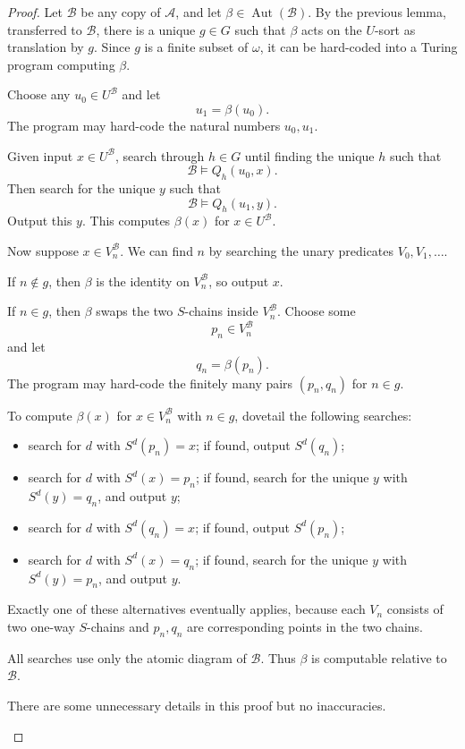 \documentclass[12pt]{article}
\newcommand{\Aut}{\operatorname{Aut}}
\newcommand{\review}[1]{\begin{reviewbox}#1\end{reviewbox}}
\begin{document}
\begin{proof}
Let $\mathcal B$ be any copy of $\mathcal A$, and let
$\beta\in\Aut(\mathcal B)$.  By the previous lemma, transferred to
$\mathcal B$, there is a unique $g\in G$ such that $\beta$ acts on the $U$-sort as translation by $g$.  Since $g$ is a finite subset of $\omega$, it can be hard-coded into a Turing program computing $\beta$.

Choose any $u_0\in U^{\mathcal B}$ and let
\[
u_1=\beta(u_0).
\]
The program may hard-code the natural numbers $u_0,u_1$.

Given input $x\in U^{\mathcal B}$, search through $h\in G$ until finding the unique $h$ such that
\[
\mathcal B\models Q_h(u_0,x).
\]
Then search for the unique $y$ such that
\[
\mathcal B\models Q_h(u_1,y).
\]
Output this $y$.  This computes $\beta(x)$ for $x\in U^{\mathcal B}$.

Now suppose $x\in V_n^{\mathcal B}$.  We can find $n$ by searching the unary predicates $V_0,V_1,\dots$.

If $n\notin g$, then $\beta$ is the identity on $V_n^{\mathcal B}$, so output $x$.

If $n\in g$, then $\beta$ swaps the two $S$-chains inside $V_n^{\mathcal B}$.  Choose some
\[
p_n\in V_n^{\mathcal B}
\]
and let
\[
q_n=\beta(p_n).
\]
The program may hard-code the finitely many pairs $(p_n,q_n)$ for $n\in g$.

To compute $\beta(x)$ for $x\in V_n^{\mathcal B}$ with $n\in g$, dovetail the following searches:
\begin{itemize}
\item search for $d$ with $S^d(p_n)=x$; if found, output $S^d(q_n)$;
\item search for $d$ with $S^d(x)=p_n$; if found, search for the unique $y$ with $S^d(y)=q_n$, and output $y$;
\item search for $d$ with $S^d(q_n)=x$; if found, output $S^d(p_n)$;
\item search for $d$ with $S^d(x)=q_n$; if found, search for the unique $y$ with $S^d(y)=p_n$, and output $y$.
\end{itemize}
Exactly one of these alternatives eventually applies, because each $V_n$ consists of two one-way $S$-chains and $p_n,q_n$ are corresponding points in the two chains.

All searches use only the atomic diagram of $\mathcal B$.  Thus $\beta$ is computable relative to $\mathcal B$.

\review{There are some unnecessary details in this proof but no inaccuracies.}

\end{proof}
\end{document}
